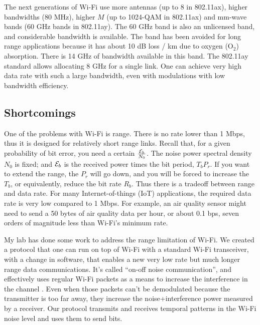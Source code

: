 The next generations of Wi-Fi use more antennas (up to 8 in 802.11ax), higher bandwidths (80 MHz), higher $M$ (up to 1024-QAM in 802.11ax) and mm-wave bands (60 GHz bands in 802.11ay).  The 60 GHz band is also an unlicensed band, and considerable bandwidth is available.   The band has been avoided for long range applications because it has about 10 dB loss / km due to oxygen (O$_2$) absorption.  There is 14 GHz of bandwidth available in this band.  The 802.11ay standard allows allocating 8 GHz for a single link.  One can achieve very high data rate with such a large bandwidth, even with modulations with low bandwidth efficiency.  



\subsection{Shortcomings}

One of the problems with Wi-Fi is range.  There is no rate lower than 1 Mbps, thus it is designed for relatively short range links. Recall that, for a given probability of bit error, you need a certain $\frac{\mathcal{E}_b}{N_0}$.  The noise power spectral density $N_0$ is fixed; and $\mathcal{E}_b$ is the received power times the bit period, $T_b P_r$.  If you want to extend the range, the $P_r$ will go down, and you will be forced to increase the $T_b$, or equivalently, reduce the bit rate $R_b$.  Thus there is a tradeoff between range and data rate.  For many Internet-of-things (IoT) applications, the required data rate is very low compared to 1 Mbps.  For example, an air quality sensor might need to send a 50 bytes of air quality data per hour, or about 0.1 bps, seven orders of magnitude less than Wi-Fi's minimum rate.  

My lab has done some work to address the range limitation of Wi-Fi.  We created a protocol that one can run on top of Wi-Fi with a standard Wi-Fi transceiver, with a change in software, that enables a new very low rate but much longer range data communications.  It's called ``on-off noise communication'', and effectively uses regular Wi-Fi packets as a means to increase the interference in the channel \cite{lundrigan2019onpc}.  Even when those packets can't be demodulated because the transmitter is too far away, they increase the noise+interference power measured by a receiver.  Our protocol transmits and receives temporal patterns in the Wi-Fi noise level and uses them to send bits.  

